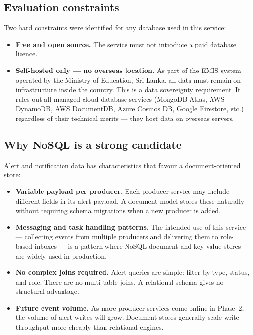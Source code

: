 \documentclass[11pt]{article}
\begin{document}
\subsection{Evaluation constraints}

Two hard constraints were identified for any database used in this service:

\begin{itemize}
  \item \textbf{Free and open source.} The service must not introduce a paid database licence.
  \item \textbf{Self-hosted only --- no overseas location.} As part of the EMIS system operated
        by the Ministry of Education, Sri Lanka, all data must remain on infrastructure inside
        the country. This is a data sovereignty requirement. It rules out all managed cloud
        database services (MongoDB Atlas, AWS DynamoDB, AWS DocumentDB, Azure Cosmos DB,
        Google Firestore, etc.) regardless of their technical merits --- they host data
        on overseas servers.
\end{itemize}

\subsection{Why NoSQL is a strong candidate}

Alert and notification data has characteristics that favour a document-oriented store:

\begin{itemize}
  \item \textbf{Variable payload per producer.} Each producer service may include different
        fields in its alert payload. A document model stores these naturally without requiring
        schema migrations when a new producer is added.
  \item \textbf{Messaging and task handling patterns.} The intended use of this service ---
        collecting events from multiple producers and delivering them to role-based inboxes ---
        is a pattern where NoSQL document and key-value stores are widely used in production.
  \item \textbf{No complex joins required.} Alert queries are simple: filter by type, status,
        and role. There are no multi-table joins. A relational schema gives no structural advantage.
  \item \textbf{Future event volume.} As more producer services come online in Phase~2,
        the volume of alert writes will grow. Document stores generally scale write throughput
        more cheaply than relational engines.
\end{itemize}
\end{document}
